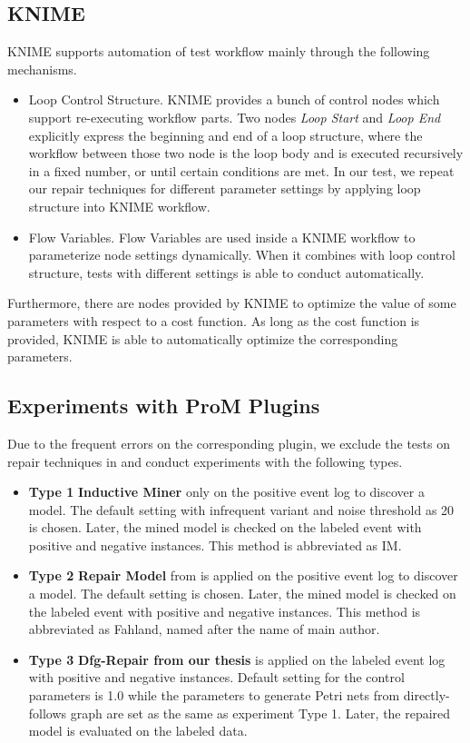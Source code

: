 \subsection{KNIME}
KNIME supports automation of test workflow mainly through the following mechanisms. 
\begin{itemize}
	\item Loop Control Structure. KNIME provides a bunch of control nodes which support re-executing workflow parts.  Two nodes \emph{Loop Start} and \emph{Loop End} explicitly express the beginning and end of a loop structure, where the workflow between those two node is the loop body and is executed recursively in a fixed number, or until certain conditions are met. In our test, we repeat our repair techniques for different parameter settings by applying loop structure into KNIME workflow.
	\item Flow Variables. Flow Variables are used inside a KNIME workflow to parameterize node settings dynamically. When it combines with loop control structure, tests with different settings is able to conduct automatically.
\end{itemize}
Furthermore, there are nodes provided by KNIME to optimize the value of some parameters with respect to a cost function. As long as the cost function is provided, KNIME is able to automatically optimize the corresponding parameters. 

\subsection{ Experiments with ProM Plugins}
Due to the frequent errors on the corresponding plugin, we exclude the tests on repair techniques in \cite{dees2017enhancing} and conduct experiments with the following types. 
\begin{itemize}
	\item \textbf{Type 1} \textbf{Inductive Miner} only on the positive event log to discover a model. The default setting with infrequent variant and noise threshold as 20 is chosen. Later, the mined model is checked on the labeled event with positive and negative instances. This method is abbreviated as IM.
	\item \textbf{Type 2} \textbf{Repair Model} from \cite{fahland2015model} is applied on the positive event log to discover a model. The default setting is chosen. Later, the mined model is checked on the labeled event with positive and negative instances. This method is abbreviated as Fahland, named after the name of main author.
	\item \textbf{Type 3} \textbf{Dfg-Repair from our thesis} is applied on the labeled event log with positive and negative instances. Default setting  for the control parameters is 1.0 while the parameters to generate Petri nets from directly-follows graph are set as the same as experiment Type 1.  Later, the repaired model is evaluated on the labeled data. 
\end{itemize}

